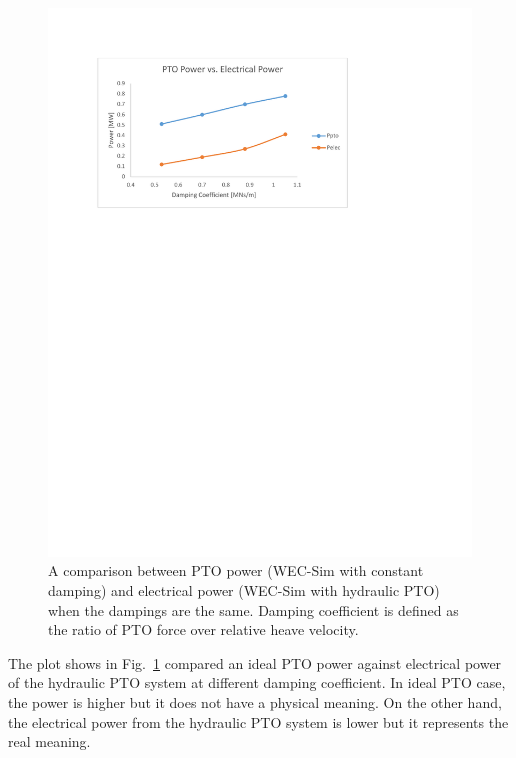 \documentclass[twocolumn,10pt]{asme2e}
\begin{document}
 \begin{figure}[t]
     \centering
     \includegraphics[width=1\columnwidth]{Images/PptovsPelec}
     \caption{A comparison between PTO power (WEC-Sim with constant damping) and electrical power (WEC-Sim with hydraulic PTO) when the dampings are the same. Damping coefficient is defined as the ratio of PTO force over relative heave velocity.}
     \label{HydDamping}
     \end{figure}  
   
 The plot shows in Fig.~\ref{HydDamping} compared an ideal PTO power against electrical power of the hydraulic PTO system at different damping coefficient. In ideal PTO case, the power is higher but it does not have a physical meaning. On the other hand, the electrical power from the hydraulic PTO system is lower but it represents the real meaning. 
 
    
\end{document}
